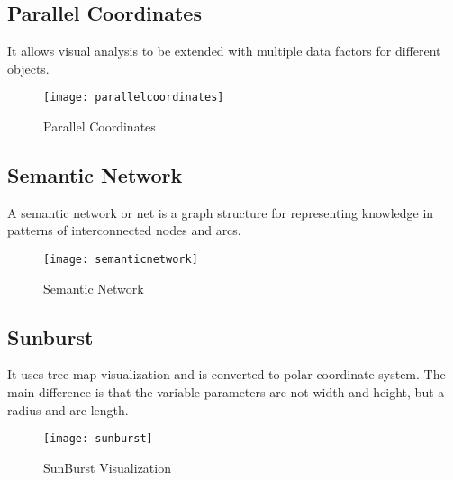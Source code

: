 \subsection{Parallel Coordinates}
It allows visual analysis to be extended with multiple data factors for different objects.
\begin{figure}[h]
	\texttt{[image: parallelcoordinates]}
	\centering
	\caption{Parallel Coordinates}
\end{figure}
\subsection{Semantic Network}
A semantic network or net is a graph structure for representing knowledge in patterns of 
interconnected nodes and arcs.
\begin{figure}[h]
	\texttt{[image: semanticnetwork]}
	\centering
	\caption{Semantic Network}
\end{figure}
\subsection{Sunburst}
It uses tree-map visualization and is converted to polar coordinate system. The main difference is that the variable parameters are not width and height, but a radius and arc length.
\begin{figure}[h]
	\texttt{[image: sunburst]}
	\centering
	\caption{SunBurst Visualization}
\end{figure}
